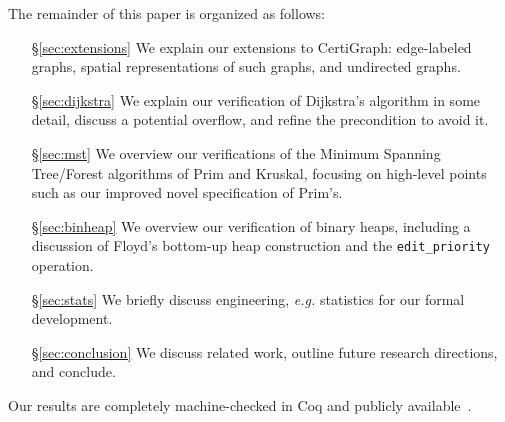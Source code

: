 The remainder of this paper is organized as follows:
\begin{itemize}
    \item[\S\ref{sec:extensions}] We explain our extensions to CertiGraph:
    edge-labeled graphs, spatial representations of such graphs, and
    undirected graphs.
    \item[\S\ref{sec:dijkstra}] We explain our verification of Dijkstra's algorithm in some detail, discuss a potential overflow, and refine the precondition to avoid it. %
    \item[\S\ref{sec:mst}] We overview our verifications of the Minimum Spanning Tree/Forest algorithms of Prim and Kruskal, focusing on high-level points such as our improved novel specification of Prim's.
    \item[\S\ref{sec:binheap}] We overview our verification of binary heaps, including a discussion of Floyd's bottom-up heap construction and the \texttt{edit\_priority} operation.
    \item[\S\ref{sec:stats}] We briefly discuss engineering, \emph{e.g.} statistics for our formal development.
    \item[\S\ref{sec:conclusion}] We discuss related work, outline future research directions, and conclude.
\end{itemize}

\noindent Our results are completely machine-checked in Coq and publicly available~\cite{anonrepo}.%
